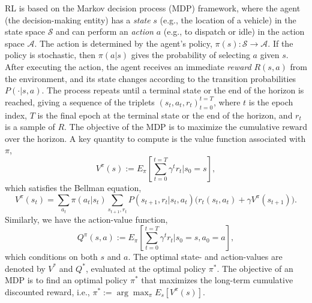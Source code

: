 \documentclass{article}
\begin{document}
RL is based on the Markov decision process (MDP) framework, where the agent (the decision-making entity) has a \emph{state} $s$ (e.g., the location of a vehicle) in the state space $\mathcal{S}$ and can perform an \emph{action} $a$ (e.g., to dispatch or idle) in the action space $\mathcal{A}$. The action is determined by the agent's policy, $\pi(s):\mathcal{S}\rightarrow \mathcal{A}$. If the policy is stochastic, then $\pi(a|s)$ gives the probability of selecting $a$ given $s$.
After executing the action, the agent receives an immediate \emph{reward} $R(s,a)$ from the environment, and its state changes according to the transition probabilities $P(\cdot | s,a)$. The process repeats until a terminal state or the end of the horizon is reached, giving a sequence of the triplets $(s_t,a_t,r_t)_{t=0}^{t=T}$, where $t$ is the epoch index, $T$ is the final epoch at the terminal state or the end of the horizon, and $r_t$ is a sample of $R$. The objective of the MDP is to maximize the cumulative reward over the horizon. A key quantity to compute is the value function associated with $\pi$,
\begin{equation*}
    V^\pi(s):=E_\pi\left[\sum_{t=0}^{t=T}\gamma^t r_t \bigg\rvert s_0=s\right],
\end{equation*}
which satisfies the Bellman equation, 
\begin{equation}\label{eq:bellman}
    V^\pi(s_t) = \sum_{a_t}\pi(a_t|s_t)\sum_{s_{t+1},r_t} P(s_{t+1},r_t|s_t,a_t)\bigg( r_t(s_t,a_t) + \gamma V^\pi(s_{t+1}) \bigg).
\end{equation}
Similarly, we have the action-value function,
\begin{equation*}
    Q^\pi(s,a):=E_\pi\left[\sum_{t=0}^{t=T}\gamma^t r_t \bigg\rvert s_0=s,a_0=a\right],
\end{equation*}
which conditions on both $s$ and $a$. The optimal  state- and action-values are denoted by $V^*$ and $Q^*$, evaluated at the optimal policy $\pi^*$. The objective of an MDP is to find an optimal policy $\pi^*$ that maximizes the long-term cumulative discounted reward, i.e., $\pi^* := \arg\max_\pi E_s [V^\pi(s)]$.
\end{document}
